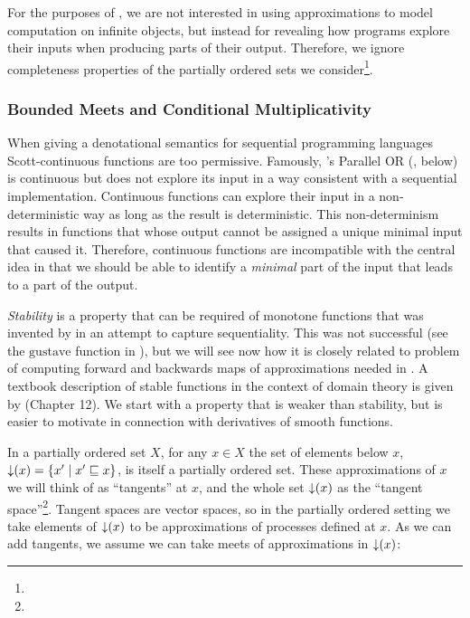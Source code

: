 For the purposes of \GPS, we are not interested in using
approximations to model computation on infinite objects, but instead
for revealing how programs explore their inputs when producing parts
of their output. Therefore, we ignore completeness properties of the
partially ordered sets we consider\footnote{}.

\subsubsection{Bounded Meets and Conditional Multiplicativity}
\label{sec:bounded-meets-and-cm}

When giving a denotational semantics for sequential programming
languages Scott-continuous functions are too permissive. Famously,
\citet{plotkin77lcf}'s Parallel OR (, below) is
continuous but does not explore its input in a way consistent with a
sequential implementation. Continuous functions can explore their
input in a non-deterministic way as long as the result is
deterministic. This non-determinism results in functions that whose
output cannot be assigned a unique minimal input that caused
it. Therefore, continuous functions are incompatible with the central
idea in \GPS that we should be able to identify a \emph{minimal} part
of the input that leads to a part of the output.

\emph{Stability} is a property that can be required of monotone functions that was invented by \citet{berry79} in an attempt to capture sequentiality. This was not successful (see the $\mathrm{gustave}$ function in ), but we will see now how it is closely related to problem of computing forward and backwards maps of approximations needed in \GPS. A textbook description of stable functions in the context of domain theory is given by \citet{amadio-curien} (Chapter 12). We start with a property that is weaker than stability, but is easier to motivate in connection with derivatives of smooth functions.

In a partially ordered set $X$, for any $x \in X$ the set of elements below $x$, $\mathop{\downarrow}(x) = \{ x' \mid x' \sqsubseteq x \}$, is itself a partially ordered set. These approximations of $x$ we will think of as ``tangents'' at $x$, and the whole set $\mathop{\downarrow}(x)$ as the ``tangent space''\footnote{}. Tangent spaces are vector spaces, so in the partially ordered setting we take elements of $\mathop{\downarrow}(x)$ to be approximations of processes defined at $x$. As we can add tangents, we assume we can take meets of approximations in $\mathop{\downarrow}(x)$:

